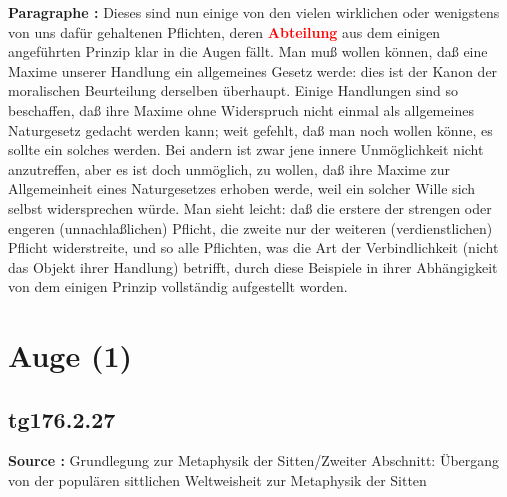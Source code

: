 \documentclass[a4paper,12pt,twoside]{book}
\newcommand{\match}[1]{\textcolor{red}{\textbf{#1}}}
\newcommand{\unnumberedsection}[1]{
	\section*{#1}
	\addcontentsline{toc}{section}{#1}
	\markright{#1}
}
\begin{document}
	\noindent\textbf{Paragraphe : }Dieses sind nun einige von den vielen wirklichen oder wenigstens von uns dafür gehaltenen Pflichten, deren \match{Abteilung} aus dem einigen angeführten Prinzip klar in die Augen fällt. Man muß wollen können, daß eine Maxime unserer Handlung ein allgemeines Gesetz werde: dies ist der Kanon der moralischen Beurteilung derselben überhaupt. Einige Handlungen sind so beschaffen, daß ihre Maxime ohne Widerspruch nicht einmal als allgemeines Naturgesetz 
	gedacht werden kann; weit gefehlt, daß man noch wollen könne, es sollte ein solches werden. Bei andern ist zwar jene innere Unmöglichkeit nicht anzutreffen, aber es ist doch unmöglich, zu wollen, daß ihre Maxime zur Allgemeinheit eines Naturgesetzes erhoben werde, weil ein solcher Wille sich selbst widersprechen würde. Man sieht leicht: daß die erstere der strengen oder engeren (unnachlaßlichen) Pflicht, die zweite nur der weiteren (verdienstlichen) Pflicht widerstreite, und so alle Pflichten, was die Art der Verbindlichkeit (nicht das Objekt ihrer Handlung) betrifft, durch diese Beispiele in ihrer Abhängigkeit von dem einigen Prinzip vollständig aufgestellt worden. 
	
	\unnumberedsection{Auge (1)} 
	\subsection*{tg176.2.27} 
	\textbf{Source : }Grundlegung zur Metaphysik der Sitten/Zweiter Abschnitt: Übergang von der populären sittlichen Weltweisheit zur Metaphysik der Sitten\\  
	
\end{document}
